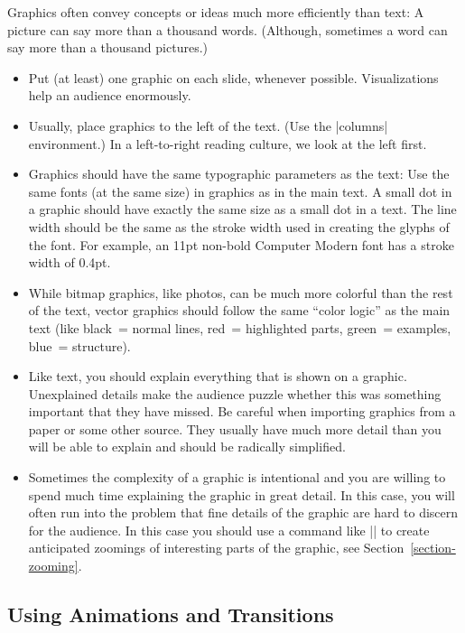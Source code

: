 Graphics often convey concepts or ideas much more efficiently than text: A picture can say more than a thousand words. (Although, sometimes a word can say more than a thousand pictures.)
\begin{itemize}
\item
  Put (at least) one graphic on each slide, whenever possible. Visualizations help an audience enormously.
\item
  Usually, place graphics to the left of the text. (Use the |columns| environment.) In a left-to-right reading culture, we look at the left first.
\item
  Graphics should have the same typographic parameters as the text: Use the same fonts (at the same size) in graphics as in the main text. A small dot in a graphic should have exactly the same size as a small dot in a text. The line width should be the same as the stroke width used in creating the glyphs of the font. For example, an 11pt non-bold Computer Modern font has a stroke width of 0.4pt.
\item
  While bitmap graphics, like photos, can be much more colorful than the rest of the text, vector graphics should follow the same ``color logic'' as the main text (like black~= normal lines, red~= highlighted parts, green~= examples, blue~= structure).
\item
  Like text, you should explain everything that is shown on a graphic. Unexplained details make the audience puzzle whether this was something important that they have missed. Be careful when importing graphics from a paper or some other source. They usually have much more detail than you will be able to explain and should be radically simplified.
\item
  Sometimes the complexity of a graphic is intentional and you are willing to spend much time explaining the graphic in great detail. In this case, you will often run into the problem that fine details of the graphic are hard to discern for the audience. In this case you should use a command like |\framezoom| to create anticipated zoomings of interesting parts of the graphic, see Section~\ref{section-zooming}.
\end{itemize}


\subsection{Using Animations and Transitions}


